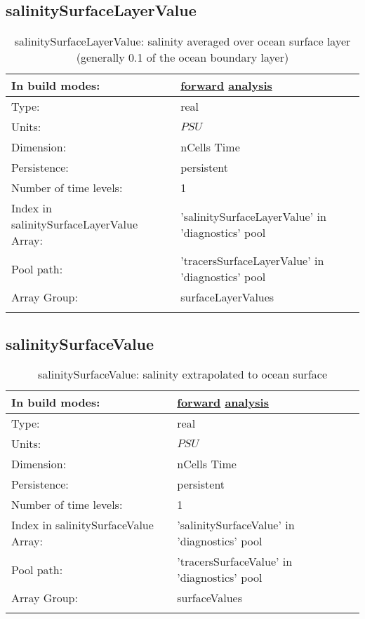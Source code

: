 \subsection[salinitySurfaceLayerValue]{salinitySurfaceLayerValue}
\label{subsec:var_sec_diagnostics_salinitySurfaceLayerValue}
\begin{center}
\begin{longtable}{| p{2.0in} | p{4.0in} |}
        \hline 
        In build modes: & \hyperref[subsec:forward_var_tab_diagnostics]{forward} \hyperref[subsec:analysis_var_tab_diagnostics]{analysis} \\
        \hline 
        Type: & real \\
        \hline 
        Units: & $PSU$ \\
        \hline 
        Dimension: & nCells Time \\
        \hline 
        Persistence: & persistent \\
        \hline 
        Number of time levels: & 1 \\
        \hline 
		 Index in salinitySurfaceLayerValue Array: & 'salinitySurfaceLayerValue' in 'diagnostics' pool \\
		 \hline 
            Pool path: & 'tracersSurfaceLayerValue' in 'diagnostics' pool
 \\
		 \hline 
		 Array Group: & surfaceLayerValues \\
		 \hline 
    \caption{salinitySurfaceLayerValue: salinity averaged over ocean surface layer (generally 0.1 of the ocean boundary layer)}
\end{longtable}
\end{center}
\subsection[salinitySurfaceValue]{salinitySurfaceValue}
\label{subsec:var_sec_diagnostics_salinitySurfaceValue}
\begin{center}
\begin{longtable}{| p{2.0in} | p{4.0in} |}
        \hline 
        In build modes: & \hyperref[subsec:forward_var_tab_diagnostics]{forward} \hyperref[subsec:analysis_var_tab_diagnostics]{analysis} \\
        \hline 
        Type: & real \\
        \hline 
        Units: & $PSU$ \\
        \hline 
        Dimension: & nCells Time \\
        \hline 
        Persistence: & persistent \\
        \hline 
        Number of time levels: & 1 \\
        \hline 
		 Index in salinitySurfaceValue Array: & 'salinitySurfaceValue' in 'diagnostics' pool \\
		 \hline 
            Pool path: & 'tracersSurfaceValue' in 'diagnostics' pool
 \\
		 \hline 
		 Array Group: & surfaceValues \\
		 \hline 
    \caption{salinitySurfaceValue: salinity extrapolated to ocean surface}
\end{longtable}
\end{center}
